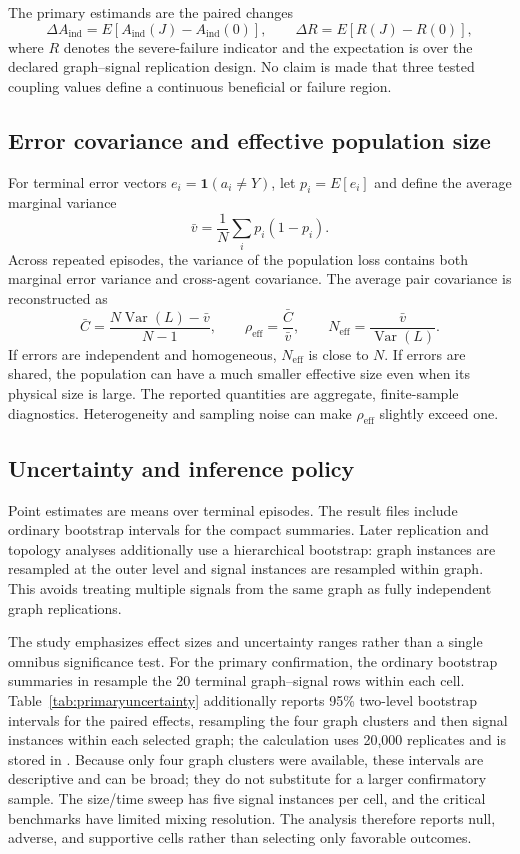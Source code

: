 \documentclass[11pt,a4paper]{article}
\begin{document}
The primary estimands are the paired changes
\[
\Delta A_{\mathrm{ind}}=E[A_{\mathrm{ind}}(J)-A_{\mathrm{ind}}(0)],
\qquad
\Delta R=E[R(J)-R(0)],
\]
where $R$ denotes the severe-failure indicator and the expectation is over the declared graph--signal replication design. No claim is made that three tested coupling values define a continuous beneficial or failure region.

\subsection{Error covariance and effective population size}

For terminal error vectors $e_i=\mathbf{1}(a_i\ne Y)$, let $p_i=E[e_i]$ and define the average marginal variance
\[
\bar v=\frac{1}{N}\sum_i p_i(1-p_i).
\]
Across repeated episodes, the variance of the population loss contains both marginal error variance and cross-agent covariance. The average pair covariance is reconstructed as
\begin{equation}
\bar C=\frac{N\operatorname{Var}(L)-\bar v}{N-1},
\qquad
\rho_{\mathrm{eff}}=\frac{\bar C}{\bar v},
\qquad
N_{\mathrm{eff}}=\frac{\bar v}{\operatorname{Var}(L)}.
\label{eq:neff}
\end{equation}
If errors are independent and homogeneous, $N_{\mathrm{eff}}$ is close to $N$. If errors are shared, the population can have a much smaller effective size even when its physical size is large. The reported quantities are aggregate, finite-sample diagnostics. Heterogeneity and sampling noise can make $\rho_{\mathrm{eff}}$ slightly exceed one.

\subsection{Uncertainty and inference policy}

Point estimates are means over terminal episodes. The result files include ordinary bootstrap intervals for the compact summaries. Later replication and topology analyses additionally use a hierarchical bootstrap: graph instances are resampled at the outer level and signal instances are resampled within graph. This avoids treating multiple signals from the same graph as fully independent graph replications.

The study emphasizes effect sizes and uncertainty ranges rather than a single omnibus significance test. For the primary confirmation, the ordinary bootstrap summaries in  resample the 20 terminal graph--signal rows within each cell. Table~\ref{tab:primaryuncertainty} additionally reports 95\% two-level bootstrap intervals for the paired effects, resampling the four graph clusters and then signal instances within each selected graph; the calculation uses 20,000 replicates and is stored in . Because only four graph clusters were available, these intervals are descriptive and can be broad; they do not substitute for a larger confirmatory sample. The size/time sweep has five signal instances per cell, and the critical benchmarks have limited mixing resolution. The analysis therefore reports null, adverse, and supportive cells rather than selecting only favorable outcomes.
\end{document}
